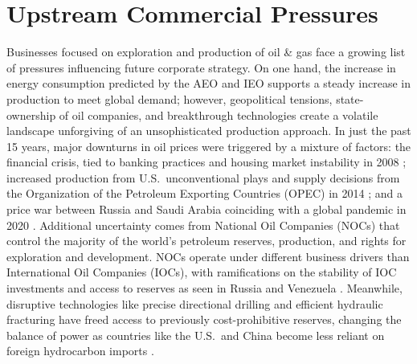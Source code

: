\section{Upstream Commercial Pressures}\label{ch1:upstream}
Businesses focused on exploration and production of oil \& gas face a growing list of pressures influencing future corporate strategy. On one hand, the increase in energy consumption predicted by the AEO and IEO supports a steady increase in production to meet global demand; however, geopolitical tensions, state-ownership of oil companies, and breakthrough technologies create a volatile landscape unforgiving of an unsophisticated production approach. In just the past 15 years, major downturns in oil prices were triggered by a mixture of factors: the financial crisis, tied to banking practices and housing market instability in 2008 \citep{singh_2007-2008_2021}; increased production from U.S.\ unconventional plays and supply decisions from the Organization of the Petroleum Exporting Countries (OPEC) in 2014 \citep{lioudis_what_2021}; and a price war between Russia and Saudi Arabia coinciding with a global pandemic in 2020 \citep{blessing_what_2021}. Additional uncertainty comes from National Oil Companies (NOCs) that control the majority of the world’s petroleum reserves, production, and rights for exploration and development. NOCs operate under different business drivers than International Oil Companies (IOCs), with ramifications on the stability of IOC investments and access to reserves as seen in Russia and Venezuela  \citep{bremmer_long_2010,pirog_role_2007}. Meanwhile, disruptive technologies like precise directional drilling and efficient hydraulic fracturing have freed access to previously cost-prohibitive reserves, changing the balance of power as countries like the U.S.\ and China become less reliant on foreign hydrocarbon imports \citep{shuen_dynamic_2014}.

